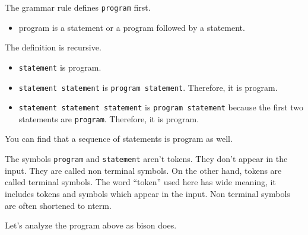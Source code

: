 The grammar rule defines \passthrough{\lstinline!program!} first.

\begin{itemize}
\tightlist
\item
  program is a statement or a program followed by a statement.
\end{itemize}

The definition is recursive.

\begin{itemize}
\tightlist
\item
  \passthrough{\lstinline!statement!} is program.
\item
  \passthrough{\lstinline!statement statement!} is
  \passthrough{\lstinline!program statement!}. Therefore, it is program.
\item
  \passthrough{\lstinline!statement statement statement!} is
  \passthrough{\lstinline!program statement!} because the first two
  statements are \passthrough{\lstinline!program!}. Therefore, it is
  program.
\end{itemize}

You can find that a sequence of statements is program as well.

The symbols \passthrough{\lstinline!program!} and
\passthrough{\lstinline!statement!} aren't tokens. They don't appear in
the input. They are called non terminal symbols. On the other hand,
tokens are called terminal symbols. The word ``token'' used here has
wide meaning, it includes tokens and symbols which appear in the input.
Non terminal symbols are often shortened to nterm.

Let's analyze the program above as bison does.

